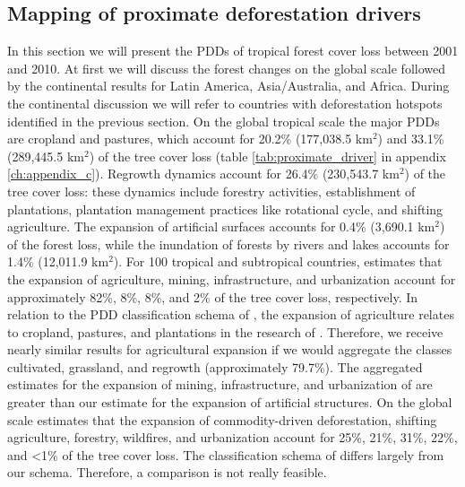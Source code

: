 		\subsection{Mapping of proximate deforestation drivers}
		\label{subsec:results_proxy_deforestation_drivers}
			In this section we will present the \acp{PDD} of tropical forest cover loss between 2001 and 2010. At first we will discuss the forest changes on the global scale followed by the continental results for Latin America, Asia/Australia, and Africa. During the continental discussion we will refer to countries with deforestation hotspots identified in the previous section. On the global tropical scale the major \acp{PDD} are cropland and pastures, which account for 20.2\% (177,038.5 km$^2$) and 33.1\% (289,445.5 km$^2$) of the tree cover loss (table \ref{tab:proximate_driver} in appendix \ref{ch:appendix_c}). Regrowth dynamics account for 26.4\% (230,543.7 km$^2$) of the tree cover loss: these dynamics include forestry activities, establishment of plantations, plantation management practices like rotational cycle, and shifting agriculture. The expansion of artificial surfaces accounts for 0.4\% (3,690.1 km$^2$) of the forest loss, while the inundation of forests by rivers and lakes accounts for 1.4\% (12,011.9 km$^2$). For 100 tropical and subtropical countries, \citet{Hosonuma2012} estimates that the expansion of agriculture, mining, infrastructure, and urbanization account for approximately 82\%, 8\%, 8\%, and 2\% of the tree cover loss, respectively. In relation to the \ac{PDD} classification schema of \citet{Geist2001}, the expansion of agriculture relates to cropland, pastures, and plantations in the research of \citet{Hosonuma2012}. Therefore, we receive nearly similar results for agricultural expansion if we would aggregate the classes cultivated, grassland, and regrowth (approximately 79.7\%). The aggregated estimates for the expansion of mining, infrastructure, and urbanization of \citet{Hosonuma2012} are greater than our estimate for the expansion of artificial structures. On the global scale \citet{Curtis2018} estimates that the expansion of commodity-driven deforestation, shifting agriculture, forestry, wildfires, and urbanization account for 25\%, 21\%, 31\%, 22\%, and <1\% of the tree cover loss. The classification schema of \citet{Curtis2018} differs largely from our schema. Therefore, a comparison is not really feasible. 

